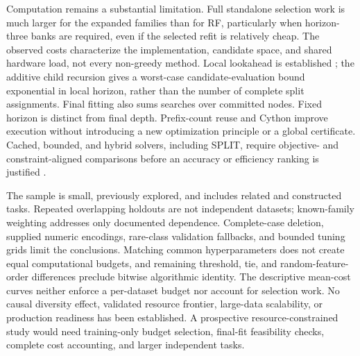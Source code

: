 Computation remains a substantial limitation. Full standalone selection
work is much larger for the expanded families than for RF, particularly
when horizon-three banks are required, even if the selected refit is
relatively cheap. The observed costs characterize the implementation,
candidate space, and shared hardware load, not every non-greedy method.
Local lookahead is established \cite{murthy1995lookahead,donick2021stepwise};
the additive child recursion gives a worst-case candidate-evaluation
bound exponential in local horizon, rather than the number of complete
split assignments. Final fitting also sums searches over committed
nodes. Fixed horizon is distinct from final depth. Prefix-count reuse
and Cython improve execution without introducing a new optimization
principle or a global certificate. Cached, bounded, and hybrid solvers,
including SPLIT, require objective- and constraint-aligned comparisons
before an accuracy or efficiency ranking is justified
\cite{aglin2020caching,demirovic2022murtree,vanderlinden2023separable,babbar2025nearoptimal}.

The sample is small, previously explored, and includes related and
constructed tasks. Repeated overlapping holdouts are not independent
datasets; known-family weighting addresses only documented dependence.
Complete-case deletion, supplied numeric encodings, rare-class validation
fallbacks, and bounded tuning grids limit the conclusions. Matching common
hyperparameters does not create equal computational budgets, and remaining
threshold, tie, and random-feature-order differences preclude bitwise
algorithmic identity. The descriptive mean-cost curves neither enforce a
per-dataset budget nor account for selection work. No causal diversity
effect, validated resource frontier, large-data scalability, or production
readiness has been established. A prospective resource-constrained study
would need training-only budget selection, final-fit feasibility checks,
complete cost accounting, and larger independent tasks.
